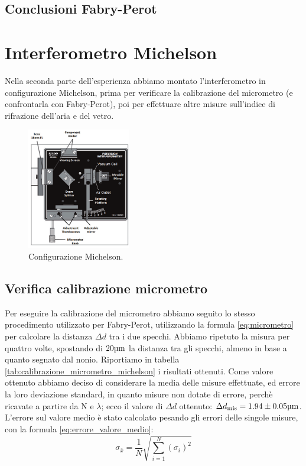 \documentclass[letterpaper,12pt]{article}
\begin{document}
\subsection{Conclusioni Fabry-Perot}

\newpage
\section{Interferometro Michelson}
Nella seconda parte dell'esperienza abbiamo montato l'interferometro in configurazione Michelson, prima per verificare 
la calibrazione del micrometro (e confrontarla con Fabry-Perot), poi per effettuare altre misure sull'indice di rifrazione
dell'aria e del vetro.
\begin{figure}[h]
    \centering
    \includegraphics[width=0.4\textwidth]{Michelson_aria.png}
    \caption{Configurazione Michelson.}
    \label{fig:michelson config}
\end{figure}

\subsection{Verifica calibrazione micrometro}
Per eseguire la calibrazione del micrometro abbiamo seguito lo stesso procedimento utilizzato per Fabry-Perot, 
utilizzando la formula \ref{eq:micrometro} per calcolare la distanza $\Delta d$ tra i due specchi. Abbiamo ripetuto
la misura per quattro volte, spostando di $20 \text{\SIUnitSymbolMicro m}$ la distanza tra gli specchi, almeno in base a quanto segnato 
dal nonio. Riportiamo in tabella \ref{tab:calibrazione_micrometro_michelson} i risultati ottenuti. Come valore ottenuto
abbiamo deciso di considerare la media delle misure effettuate, ed errore la loro deviazione standard, in quanto 
misure non dotate di errore, perchè ricavate a partire da N e $\lambda$; ecco il valore di $\Delta d$ ottenuto: 
$\Delta d_\text{mis} = 1.94 \pm0.05\text{\SIUnitSymbolMicro m} $. L'errore sul valore medio è stato calcolato pesando 
gli errori delle singole misure, con la formula \ref{eq:errore_valore_medio}:
\begin{equation}
    \sigma_{\bar{x}} = \frac{1}{N} \sqrt{\sum_{i=1}^{N} (\sigma_i)^2}
    \label{eq:errore_valore_medio}
\end{equation}
\end{document}
